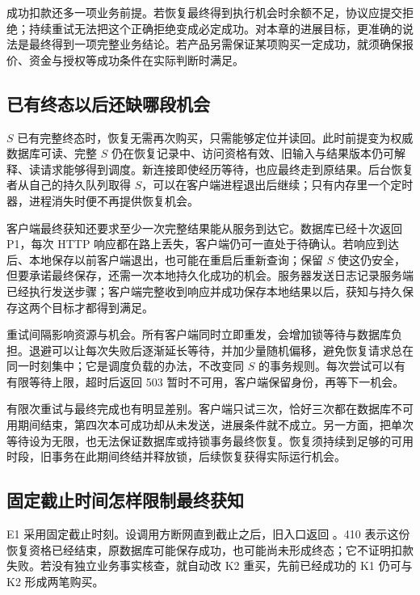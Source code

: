 

成功扣款还多一项业务前提。若恢复最终得到执行机会时余额不足，协议应提交拒绝；持续重试无法把这个正确拒绝变成必定成功。对本章的进展目标，更准确的说法是最终得到一项完整业务结论。若产品另需保证某项购买一定成功，就须确保报价、资金与授权等成功条件在实际判断时满足。

\subsection*{已有终态以后还缺哪段机会}

\(S\) 已有完整终态时，恢复无需再次购买，只需能够定位并读回。此时前提变为权威数据库可读、完整 \(S\) 仍在恢复记录中、访问资格有效、旧输入与结果版本仍可解释、读请求能够得到调度。新连接即使经历等待，也应最终走到原结果。后台恢复者从自己的持久队列取得 \(S\)，可以在客户端进程退出后继续；只有内存里一个定时器，进程消失时便不再提供恢复机会。

客户端最终获知还要求至少一次完整结果能从服务到达它。数据库已经十次返回 P1，每次 HTTP 响应都在路上丢失，客户端仍可一直处于待确认。若响应到达后、本地保存以前客户端退出，也可能在重启后重新查询；保留 \(S\) 使这仍安全，但要承诺最终保存，还需一次本地持久化成功的机会。服务器发送日志记录服务端已经执行发送步骤；客户端完整收到响应并成功保存本地结果以后，获知与持久保存这两个目标才都得到满足。

重试间隔影响资源与机会。所有客户端同时立即重发，会增加锁等待与数据库负担。退避可以让每次失败后逐渐延长等待，并加少量随机偏移，避免恢复请求总在同一时刻集中；它是调度负载的办法，不改变同 \(S\) 的事务规则。每次尝试可以有有限等待上限，超时后返回 503 暂时不可用，客户端保留身份，再等下一机会。

有限次重试与最终完成也有明显差别。客户端只试三次，恰好三次都在数据库不可用期间结束，第四次本可成功却从未发送，进展条件就不成立。另一方面，把单次等待设为无限，也无法保证数据库或持锁事务最终恢复。恢复须持续到足够的可用时段，旧事务在此期间终结并释放锁，后续恢复获得实际运行机会。

\subsection*{固定截止时间怎样限制最终获知}

E1 采用固定截止时刻。设调用方断网直到截止之后，旧入口返回 。410 表示这份恢复资格已经结束，原数据库可能保存成功，也可能尚未形成终态；它不证明扣款失败。若没有独立业务事实核查，就自动改 K2 重买，先前已经成功的 K1 仍可与 K2 形成两笔购买。

